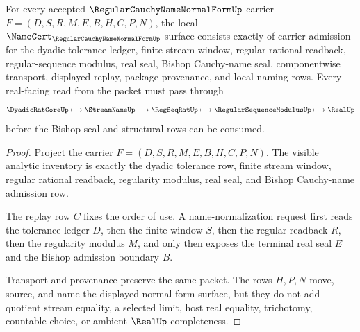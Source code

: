 \begin{theorem}
\label{thm:regular-cauchy-name-normal-form-namecert-obligations}
For every accepted $\RegularCauchyNameNormalFormUp$ carrier $F=(D,S,R,M,E,B,H,C,P,N)$, the local $\NameCert_{\RegularCauchyNameNormalFormUp}$ surface consists exactly of carrier admission for the dyadic tolerance ledger, finite stream window, regular rational readback, regular-sequence modulus, real seal, Bishop Cauchy-name seal, componentwise transport, displayed replay, package provenance, and local naming rows. Every real-facing read from the packet must pass through
$$
\DyadicRatCoreUp \longmapsto \StreamNameUp \longmapsto \RegSeqRatUp \longmapsto \RegularSequenceModulusUp \longmapsto \RealUp
$$
before the Bishop seal and structural rows can be consumed.
\end{theorem}
\begin{proof}
Project the carrier $F=(D,S,R,M,E,B,H,C,P,N)$. The visible analytic inventory is exactly the dyadic tolerance row, finite stream window, regular rational readback, regularity modulus, real seal, and Bishop Cauchy-name admission row.

The replay row $C$ fixes the order of use. A name-normalization request first reads the tolerance ledger $D$, then the finite window $S$, then the regular readback $R$, then the regularity modulus $M$, and only then exposes the terminal real seal $E$ and the Bishop admission boundary $B$.

Transport and provenance preserve the same packet. The rows $H,P,N$ move, source, and name the displayed normal-form surface, but they do not add quotient stream equality, a selected limit, host real equality, trichotomy, countable choice, or ambient $\RealUp$ completeness.
\end{proof}

